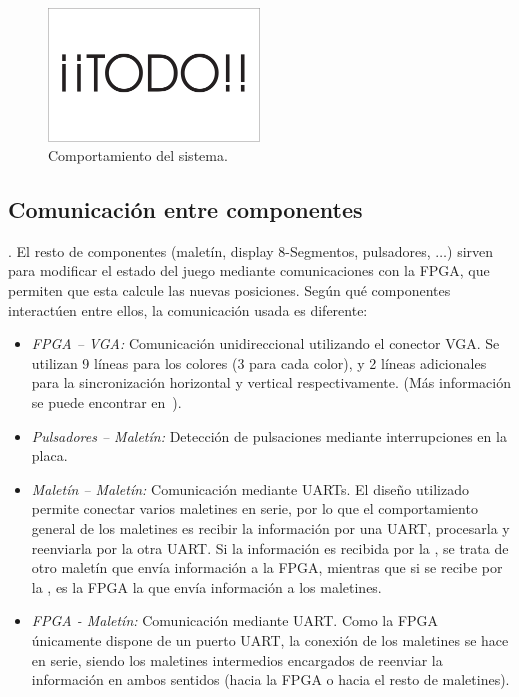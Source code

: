 
\begin{figure}[h]
  \centering
  \includegraphics[width=0.5\textwidth]{images/Todo.pdf}
  \caption{Comportamiento del sistema.}
  \label{s2:fig:comportamiento}
\end{figure}

\subsection{Comunicación entre componentes}
\label{s2:subsec:comunicacion}
. El resto de componentes (maletín, display 8-Segmentos,
pulsadores, $\ldots$) sirven para modificar el estado del juego mediante
comunicaciones con la FPGA, que permiten que esta calcule las nuevas
posiciones. Según qué componentes interactúen entre ellos, la comunicación
usada es diferente:
\begin{itemize}
\item \emph{FPGA -- VGA:} Comunicación unidireccional utilizando el
  conector VGA. Se utilizan 9 líneas para los colores (3 para cada color),
  y 2 líneas adicionales para la sincronización horizontal y vertical
  respectivamente.  (Más información se
  puede encontrar en~\cite{Spartan3-StarterKit}).
\item \emph{Pulsadores -- Maletín:} Detección de pulsaciones mediante
  interrupciones en la placa.
\item \emph{Maletín -- Maletín:} Comunicación mediante UARTs. El diseño
  utilizado permite conectar varios maletines en serie, por lo que el
  comportamiento general de los maletines es recibir la información por una
  UART, procesarla y reenviarla por la otra UART. Si la información es
  recibida por la , se trata de otro maletín que envía información a la
  FPGA, mientras que si se recibe por la , es la FPGA la que envía
  información a los maletines.
\item \emph{FPGA - Maletín:} Comunicación mediante UART. Como la FPGA
  únicamente dispone de un puerto UART, la conexión de los maletines se
  hace en serie, siendo los maletines intermedios encargados de reenviar la
  información en ambos sentidos (hacia la FPGA o hacia el resto de
  maletines).
\end{itemize}

